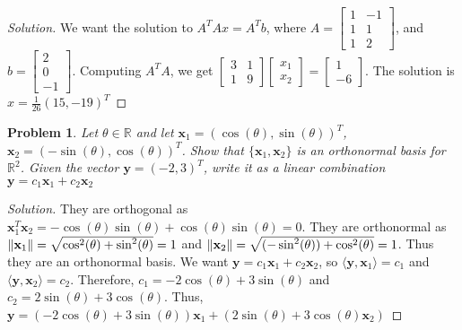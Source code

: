 \documentclass{article}
\theoremstyle{mystyle}
\newtheorem{problem}{Problem}[section]
\begin{document}
\begin{proof}[Solution]
We want the solution to $A^T A x = A^T b$, where $A = \begin{bmatrix} 1 & -1 \\ 1 & 1 \\ 1 & 2 \end{bmatrix}$, and $b = \begin{bmatrix} 2\\0\\-1\end{bmatrix}$. Computing $A^T A$, we get $\begin{bmatrix} 3 & 1 \\ 1 & 9 \end{bmatrix} \begin{bmatrix} x_1 \\ x_2 \end{bmatrix} = \begin{bmatrix} 1 \\ -6 \end{bmatrix}$. The solution is $x = \frac{1}{26}(15,-19)^T$
\end{proof}
\begin{problem}
Let $\theta\in\mathbb{R}$ and let $\mathbf{x}_1 = (\cos(\theta), \sin(\theta))^{T}$, $\mathbf{x}_2 = (-\sin(\theta), \cos(\theta))^{T}$. Show that $\{\mathbf{x}_1,\mathbf{x}_2\}$ is an orthonormal basis for $\mathbb{R}^2$. Given the vector $\mathbf{y} = (-2, 3)^{T}$, write it as a linear combination $\mathbf{y} = c_1 \mathbf{x}_1+c_2\mathbf{x}_2$
\end{problem}
\begin{proof}[Solution]
They are orthogonal as $\mathbf{x}_1^T \mathbf{x}_2 = -\cos(\theta)\sin(\theta) + \cos(\theta)\sin(\theta) = 0$. They are orthonormal as $\norm{\mathbf{x}_1} = \sqrt{\cos^2(\theta)+\sin^2(\theta)} = 1$ and $\norm{\mathbf{x}_2} = \sqrt{(-\sin^2(\theta))+\cos^2(\theta)}=1$. Thus they are an orthonormal basis. We want $\mathbf{y} = c_1 \mathbf{x}_1 + c_2 \mathbf{x}_2$, so $\langle \mathbf{y}, \mathbf{x}_{1}\rangle = c_{1}$ and $\langle \mathbf{y},\mathbf{x}_{2}\rangle = c_{2}$. Therefore, $c_1 = -2\cos(\theta)+3\sin(\theta)$ and $c_2 = 2\sin(\theta)+3\cos(\theta)$. Thus, $\mathbf{y} = (-2\cos(\theta)+3\sin(\theta))\mathbf{x}_1 + (2\sin(\theta)+3\cos(\theta)\mathbf{x}_2)$
\end{proof}
\end{document}
